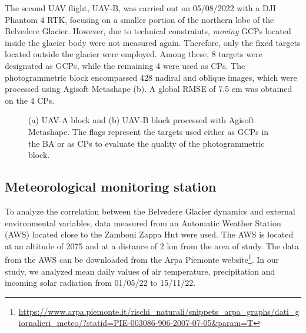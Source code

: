 The second UAV flight, UAV-B, was carried out on 05/08/2022 with a DJI Phantom
4 RTK, focusing on a smaller portion of the northern lobe of the Belvedere Glacier.
However, due to technical constraints, \textit{moving} GCPs located inside the
glacier body were not measured again.
Therefore, only the fixed targets located outside the glacier were employed.
Among these, 8 targets were designated as GCPs, while the remaining 4 were used as CPs.
The photogrammetric block encompassed 428 nadiral and oblique images, which
were processed using Agisoft Metashape (b).
A global RMSE of 7.5 cm was obtained on the 4 CPs.

\begin{figure}
  \centering
  \caption{(a) UAV-A block and (b) UAV-B block processed with Agisoft Metashape. The
    flags represent the targets used either as GCPs in the BA or as CPs to evaluate the
    quality of the photogrammetric block.}
  \label{fig:4:uavblocks}
\end{figure}

\subsection{Meteorological monitoring station}\label{sec:4:meteostation}

To analyze the correlation between the Belvedere Glacier dynamics and
external environmental variables, data measured from an Automatic Weather Station (AWS)
located close to the Zamboni Zappa Hut were used.
The AWS is located at an altitude of \SI{2075}{\masl} and at a distance of
2 km from the area of study.
The data from the AWS can be downloaded from the Arpa Piemonte
website\footnote{\url{https://www.arpa.piemonte.it/rischi_naturali/snippets_arpa_graphs/dati_giornalieri_meteo/?statid=PIE-003086-906-2007-07-05&param=T}}.
In our study, we analyzed mean daily values of air temperature, precipitation and
incoming solar radiation from 01/05/22 to 15/11/22.


